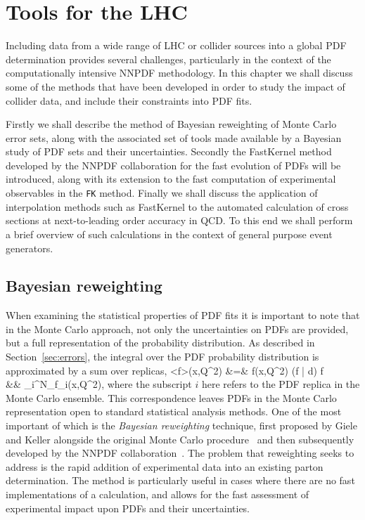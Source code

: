 \chapter{Tools for the LHC}
\label{ch:LHCtools}
Including data from a wide range of LHC or collider sources into a global PDF determination provides several challenges, particularly in the context of the computationally intensive 
NNPDF methodology. In this chapter we shall discuss some of the methods that have been developed in order to study the impact of collider data, and include their constraints into
PDF fits.

Firstly we shall describe the method of Bayesian reweighting of Monte Carlo error sets, along with the associated set of tools made available by a Bayesian study of PDF sets and their uncertainties.
Secondly the FastKernel method developed by the NNPDF collaboration for the fast evolution of PDFs will be introduced, along with its extension to the fast computation of experimental observables in the {\tt FK} method.
Finally we shall discuss the application of interpolation methods such as FastKernel to the automated calculation of cross sections at next-to-leading order accuracy in QCD. To this end
we shall perform a brief overview of such calculations in the context of general purpose event generators.

\section{Bayesian reweighting}
When examining the statistical properties of PDF fits it is important to note that in the Monte Carlo approach, not only the uncertainties on PDFs are provided, but a full representation of the probability distribution.
As described in Section~\ref{sec:errors}, the integral over the PDF probability distribution is approximated by a sum over replicas,
\ba \left<f\right>(x,Q^2) &=& \int f(x,Q^2) \left(f \middle| d\right) f \nonumber \\
&\approx& \sum_i^{N_{}}f_i(x,Q^2),
\ea
where the subscript $i$ here refers to the PDF replica in the Monte Carlo ensemble. This correspondence leaves PDFs in the Monte Carlo representation open to standard statistical analysis methods. One of the most important of which is the \emph{Bayesian reweighting} technique, first proposed by Giele and Keller
alongside the original Monte Carlo procedure~\cite{Giele:1998gw} and then subsequently developed by the NNPDF collaboration~\cite{Ball:2011gg,Ball:2010gb}. The problem that reweighting seeks to address is the rapid addition of experimental data into an existing parton determination. The method is particularly useful in cases where there are no fast implementations of a calculation, and allows for the fast assessment of experimental impact upon PDFs and their uncertainties. 

